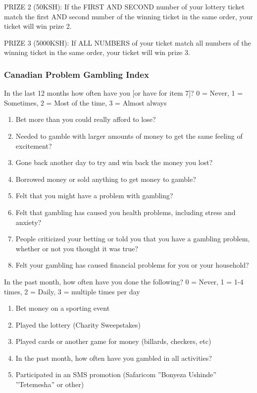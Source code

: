 \documentclass[11pt]{article}
\begin{document}
            PRIZE 2 (50KSH): If the FIRST AND SECOND number of your lottery ticket match the first AND second number of the winning ticket in the same order, your ticket will win prize 2.

            PRIZE 3 (5000KSH): If ALL NUMBERS of your ticket match all numbers of the winning ticket in the same order, your ticket will win prize 3.

        \subsubsection{Canadian Problem Gambling Index}

        In the last 12 months how often have you [or have for item 7]? 0 = Never, 1 = Sometimes, 2 = Most of the time, 3 = Almost always

        \begin{enumerate}
            \item Bet more than you could really afford to lose?
        	\item Needed to gamble with larger amounts of money to get the same feeling of excitement?
        	\item Gone back another day to try and win back the money you lost?
        	\item Borrowed money or sold anything to get money to gamble?
        	\item Felt that you might have a problem with gambling?
        	\item Felt that gambling has caused you health problems, including stress and anxiety?
        	\item People criticized your betting or told you that you have a gambling problem, whether or not you thought it was true?
        	\item Felt your gambling has caused financial problems for you or your household?
        \end{enumerate}

        In the past month, how often have you done the following? 0 = Never, 1 = 1-4 times, 2 = Daily, 3 = multiple times per day

        \begin{enumerate}
        	\item Bet money on a sporting event
        	\item Played the lottery (Charity Sweepstakes)
        	\item Played cards or another game for money (billards, checkers, etc)
        	\item In the past month, how often have you gambled in all activities?
        	\item Participated in an SMS promotion (Safaricom ''Bonyeza Ushinde'' ''Tetemesha'' or other)
        \end{enumerate}
\end{document}
